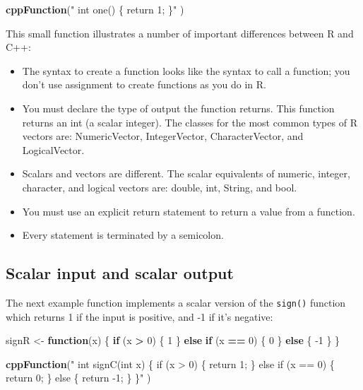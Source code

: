 \documentclass[
]{krantz}
\makeatletter
\newenvironment{Shaded}{\begin{snugshade}}{\end{snugshade}}
\newcommand{\ControlFlowTok}[1]{\textcolor[rgb]{0.27,0.27,0.27}{\textbf{#1}}}
\newcommand{\DecValTok}[1]{\textcolor[rgb]{0.06,0.06,0.06}{#1}}
\newcommand{\KeywordTok}[1]{\textcolor[rgb]{0.27,0.27,0.27}{\textbf{#1}}}
\newcommand{\NormalTok}[1]{#1}
\newcommand{\OperatorTok}[1]{\textcolor[rgb]{0.43,0.43,0.43}{\textbf{#1}}}
\newcommand{\StringTok}[1]{\textcolor[rgb]{0.5,0.5,0.5}{#1}}
\providecommand{\tightlist}{%
  \setlength{\itemsep}{0pt}\setlength{\parskip}{0pt}}
\newenvironment{kframe}{%
\medskip{}
\setlength{\fboxsep}{.8em}
 \def\at@end@of@kframe{}%
 \ifinner\ifhmode%
  \def\at@end@of@kframe{\end{minipage}}%
  \begin{minipage}{\columnwidth}%
 \fi\fi%
 \def\FrameCommand##1{\hskip\@totalleftmargin \hskip-\fboxsep
 \colorbox{shadecolor}{##1}\hskip-\fboxsep
     \hskip-\linewidth \hskip-\@totalleftmargin \hskip\columnwidth}%
 \MakeFramed {\advance\hsize-\width
   \@totalleftmargin\z@ \linewidth\hsize
   \@setminipage}}%
 {\par\unskip\endMakeFramed%
 \at@end@of@kframe}
\renewenvironment{Shaded}{\begin{kframe}}{\end{kframe}}
\makeatother
\begin{document}
\begin{Shaded}
\begin{Highlighting}[]
\KeywordTok{cppFunction}\NormalTok{(}\StringTok{"}
\StringTok{  int one() \{}
\StringTok{    return 1;}
\StringTok{  \}"}
\NormalTok{)}
\end{Highlighting}
\end{Shaded}

This small function illustrates a number of important differences between R and C++:

\begin{itemize}
\tightlist
\item
  The syntax to create a function looks like the syntax to call a function; you don't use assignment to create functions as you do in R.
\item
  You must declare the type of output the function returns. This function returns an int (a scalar integer). The classes for the most common types of R vectors are: NumericVector, IntegerVector, CharacterVector, and LogicalVector.
\item
  Scalars and vectors are different. The scalar equivalents of numeric, integer, character, and logical vectors are: double, int, String, and bool.
\item
  You must use an explicit return statement to return a value from a function.
\item
  Every statement is terminated by a semicolon.
\end{itemize}

\hypertarget{scalar-input-and-scalar-output}{%
\subsection{Scalar input and scalar output}\label{scalar-input-and-scalar-output}}

The next example function implements a scalar version of the \texttt{sign()} function which returns 1 if the input is positive, and -1 if it's negative:

\begin{Shaded}
\begin{Highlighting}[]
\NormalTok{signR \textless{}{-}}\StringTok{ }\ControlFlowTok{function}\NormalTok{(x) \{}
    \ControlFlowTok{if}\NormalTok{ (x }\OperatorTok{\textgreater{}}\StringTok{ }\DecValTok{0}\NormalTok{) \{}
        \DecValTok{1}
\NormalTok{    \} }\ControlFlowTok{else} \ControlFlowTok{if}\NormalTok{ (x }\OperatorTok{==}\StringTok{ }\DecValTok{0}\NormalTok{) \{}
        \DecValTok{0}
\NormalTok{    \} }\ControlFlowTok{else}\NormalTok{ \{}
        \DecValTok{{-}1}
\NormalTok{    \}}
\NormalTok{\}}

\KeywordTok{cppFunction}\NormalTok{(}\StringTok{"}
\StringTok{  int signC(int x) \{}
\StringTok{    if (x \textgreater{} 0) \{}
\StringTok{      return 1;}
\StringTok{    \} else if (x == 0) \{}
\StringTok{      return 0;}
\StringTok{    \} else \{}
\StringTok{      return {-}1;}
\StringTok{    \}}
\StringTok{  \}"}
\NormalTok{)}
\end{Highlighting}
\end{Shaded}
\end{document}
